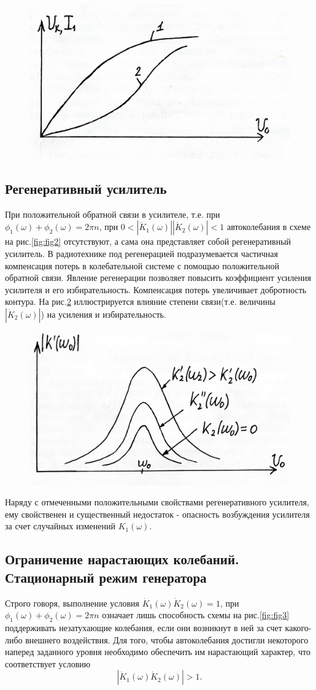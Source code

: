 \begin{figure}[h]
	\centering
	\includegraphics[width=0.5\linewidth]{circuit/fig6}
	\caption{}
	\label{fig:fig6}
\end{figure}

\subsection{Регенеративный усилитель}
При положительной обратной связи в усилителе, т.е. при $\phi_1(\omega)+\phi_2(\omega)=2\pi n$, при $0<|\dot{K}_1(\omega)||\dot{K}_2(\omega)|<1$ автоколебания в схеме на рис.\ref{fig:fig2} отсутствуют, а сама она представляет собой регенеративный усилитель. В радиотехнике под регенерацией подразумевается частичная компенсация потерь в колебательной системе с помощью положительной обратной связи. Явление регенерации позволяет повысить коэффициент усиления усилителя и его избирательность. Компенсация потерь увеличивает добротность контура. На рис.\ref{fig:fig7} иллюстрируется влияние степени связи(т.е. величины $|\dot{K}_2(\omega)|$) на усиления и избирательность.

\begin{figure}[h]
	\centering
	\includegraphics[width=0.6\linewidth]{circuit/fig7}
	\caption{}
	\label{fig:fig7}
\end{figure}

Наряду с отмеченными положительными свойствами регенеративного усилителя, ему свойственен и существенный недостаток - опасность возбуждения усилителя за счет случайных изменений $K_1(\omega)$.

\subsection{Ограничение нарастающих колебаний. Стационарный режим генератора} 
Строго говоря, выполнение условия $\dot{K}_1(\omega)\dot{K}_2(\omega)=1$, при $\phi_1(\omega)+\phi_2(\omega)=2\pi n$ означает лишь способность схемы на рис.\ref{fig:fig3} поддерживать незатухающие колебания, если они возникнут в ней за счет какого-либо внешнего воздействия. Для того, чтобы автоколебания достигли некоторого наперед заданного уровня необходимо обеспечить им нарастающий характер, что соответствует условию
\begin{equation*}
|\dot{K}_1(\omega)\dot{K}_2(\omega)|>1.
\end{equation*}


